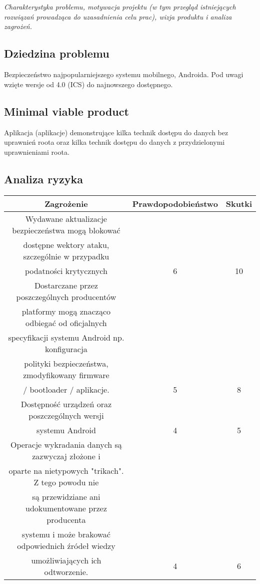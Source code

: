 \documentclass[polish,12pt]{aghthesis}
\author{Gabriela Kowalik, Mateusz Olczyk, Rafał Pietruszka}
\date{\the\year}
\begin{document}
\maketitle

\section{\SectionTitleProjectVision}
\label{sec:cel-wizja}
\emph{Charakterystyka problemu, motywacja projektu (w tym przegląd
    istniejących rozwiązań prowadząca do uzasadnienia celu prac),
    wizja produktu i analiza zagrożeń.}  %
\subsection{Dziedzina problemu}
Bezpieczeństwo najpopularniejszego systemu mobilnego, Androida.
Pod uwagi wzięte wersje od 4.0 (ICS) do najnowszego dostępnego.
\subsection{Minimal viable product}
Aplikacja (aplikacje) demonstrujące kilka technik dostępu do danych bez uprawnień roota oraz kilka technik dostępu do danych z przydzielonymi uprawnieniami roota.
\subsection{Analiza ryzyka}
\begin{tabular}{|c|c|c|}
    \hline
    \textbf{Zagrożenie} & \textbf{Prawdopodobieństwo} & \textbf{Skutki} \\ 
    \hline
    Wydawane aktualizacje bezpieczeństwa mogą blokować\\
    dostępne wektory ataku, szczególnie w przypadku\\
    podatności krytycznych & 6 & 10 \\
    \hline
    Dostarczane przez poszczególnych producentów\\
    platformy mogą znacząco	odbiegać od oficjalnych\\
    specyfikacji systemu Android np. konfiguracja\\
    polityki bezpieczeństwa, zmodyfikowany firmware\\
    / bootloader / aplikacje. & 5 & 8 \\
    \hline
    Dostępność urządzeń oraz poszczególnych wersji\\
    systemu Android & 4 & 5 \\
    \hline
    Operacje wykradania danych są zazwyczaj złożone i\\
    oparte na nietypowych "trikach". Z tego powodu nie\\
    są przewidziane ani udokumentowane przez producenta\\
    systemu i może brakować odpowiednich źródeł wiedzy\\
    umożliwiających ich odtworzenie. & 4 & 6 \\
    \hline
\end{tabular}
\end{document}
